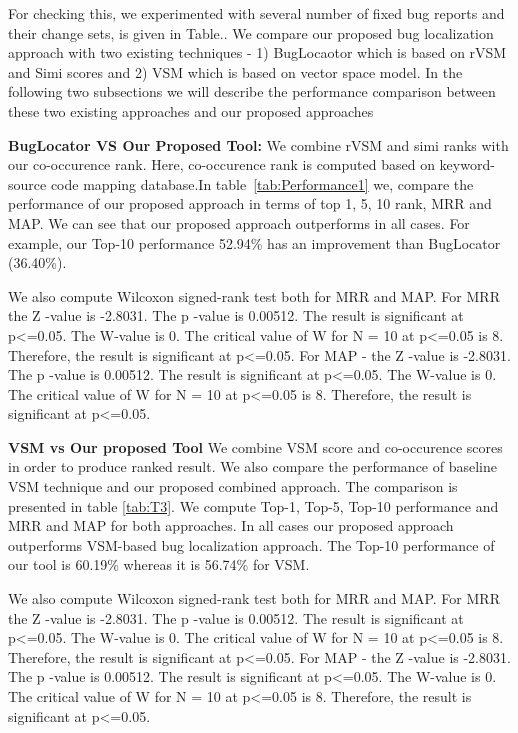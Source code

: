 \documentclass[conference]{IEEEtran}
\begin{document}
For checking this, we experimented with several number of fixed bug reports and their change sets, is given in Table..
We compare our proposed bug localization approach with two existing techniques - 1) BugLocaotor which is based on rVSM and Simi scores and 2) VSM which is based on vector space model. In the following two subsections we will describe the performance comparison between these two existing approaches and our proposed approaches

\textbf{BugLocator VS Our Proposed Tool:}
We combine rVSM and simi ranks with our co-occurence rank. Here, co-occurence rank is computed based on keyword-source code mapping database.In table~\ref{tab:Performance1} we, compare the performance of our proposed approach in terms of top 1, 5, 10 rank, MRR and MAP. We can see that our proposed approach outperforms in all cases. For example, our Top-10 performance 52.94\% has an improvement than BugLocator (36.40\%).

We also compute Wilcoxon signed-rank test both for MRR and MAP. For MRR the {Z} -value is -2.8031. The {p} -value is 0.00512. The result is significant at p<=0.05. The W-value is 0. The critical value of W for N = 10 at p<=0.05 is 8. Therefore, the result is significant at p<=0.05.
For MAP - the {Z} -value is -2.8031. The {p} -value is 0.00512. The result is significant at p<=0.05. The W-value is 0. The critical value of W for N = 10 at p<=0.05 is 8. Therefore, the result is significant at p<=0.05.


\textbf{VSM vs Our proposed Tool}
We combine VSM score and co-occurence scores in order to produce ranked result. We also compare the performance of baseline VSM technique and our proposed combined approach. The comparison is presented in table \ref{tab:T3}. We compute Top-1, Top-5, Top-10 performance and MRR and MAP for both approaches. In all cases our proposed approach outperforms VSM-based bug localization approach. The Top-10 performance of our tool is 60.19\% whereas it is 56.74\% for VSM.

We also compute Wilcoxon signed-rank test both for MRR and MAP. For MRR the {Z} -value is -2.8031. The {p} -value is 0.00512. The result is significant at p<=0.05. The W-value is 0. The critical value of W for N = 10 at p<=0.05 is 8. Therefore, the result is significant at p<=0.05.
For MAP - the {Z} -value is -2.8031. The {p} -value is 0.00512. The result is significant at p<=0.05. The W-value is 0. The critical value of W for N = 10 at p<=0.05 is 8. Therefore, the result is significant at p<=0.05.
\end{document}
